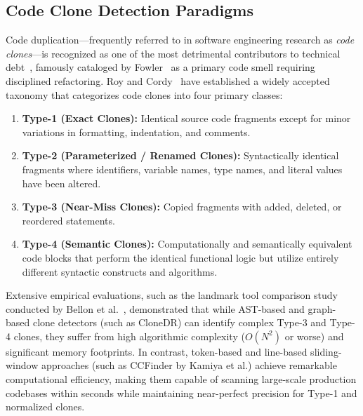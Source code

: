 \subsection{Code Clone Detection Paradigms}
Code duplication—frequently referred to in software engineering research as \textit{code clones}—is recognized as one of the most detrimental contributors to technical debt~\cite{cunningham1992,avgeriou2016}, famously cataloged by Fowler~\cite{fowler1999} as a primary code smell requiring disciplined refactoring. Roy and Cordy~\cite{roy2007} have established a widely accepted taxonomy that categorizes code clones into four primary classes:
\begin{enumerate}
    \item \textbf{Type-1 (Exact Clones):} Identical source code fragments except for minor variations in formatting, indentation, and comments.
    \item \textbf{Type-2 (Parameterized / Renamed Clones):} Syntactically identical fragments where identifiers, variable names, type names, and literal values have been altered.
    \item \textbf{Type-3 (Near-Miss Clones):} Copied fragments with added, deleted, or reordered statements.
    \item \textbf{Type-4 (Semantic Clones):} Computationally and semantically equivalent code blocks that perform the identical functional logic but utilize entirely different syntactic constructs and algorithms.
\end{enumerate}

Extensive empirical evaluations, such as the landmark tool comparison study conducted by Bellon et al.~\cite{bellon2007}, demonstrated that while AST-based and graph-based clone detectors (such as CloneDR) can identify complex Type-3 and Type-4 clones, they suffer from high algorithmic complexity ($O(N^2)$ or worse) and significant memory footprints. In contrast, token-based and line-based sliding-window approaches (such as CCFinder by Kamiya et al.) achieve remarkable computational efficiency, making them capable of scanning large-scale production codebases within seconds while maintaining near-perfect precision for Type-1 and normalized clones.

